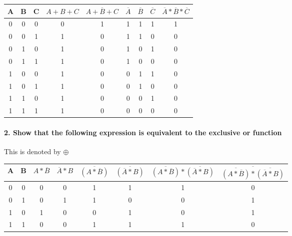 \begin{enumerate}
	\begin{table}[H]
		\centering
		\begin{tabular}{|c|c|c|c|c|c|c|c|c|}
			\hline
			A & B & C & $A+B+C$ & $\overline{A+B+C}$ & $\overline{A}$ & $\overline{B}$ & $\overline{C}$ & $\overline{A}*\overline{B}*\overline{C}$ \\\hline
			0 & 0 & 0 & 0     & 1                & 1            & 1            & 1   	  & 1                                      \\\hline
			0 & 0 & 1 & 1     & 0                & 1            & 1            & 0            & 0                                      \\\hline
			0 & 1 & 0 & 1     & 0                & 1            & 0            & 1            & 0                                      \\\hline
			0 & 1 & 1 & 1     & 0                & 1            & 0            & 0            & 0                                      \\\hline
			1 & 0 & 0 & 1     & 0                & 0            & 1            & 1            & 0                                      \\\hline
			1 & 0 & 1 & 1     & 0                & 0            & 1            & 0            & 0                                      \\\hline
			1 & 1 & 0 & 1     & 0                & 0            & 0            & 1            & 0                                      \\\hline
			1 & 1 & 1 & 1     & 0                & 0            & 0            & 0            & 0                                      \\\hline
		\end{tabular}
	\end{table}
\end{enumerate}

\paragraph{2. Show that the following expression is equivalent to the exclusive or function}

This is denoted by $\oplus$

\begin{table}[H]
	\centering
	\begin{tabular}{|c|c|c|c|c|c|c|c|}
		\hline
		A & B & $A * \overline{B}$ & $\overline{A} * B$ & $\overline{(A * \overline{B})}$ & $\overline{(\overline{A} * B)}$ & $\overline{(A * \overline{B})} * \overline{(\overline{A} * B)}$ & $\overline{\overline{(A * \overline{B})} * \overline{(\overline{A} * B)}}$\\\hline
		0 & 0 & 0 & 0 & 1 & 1 & 1 & 0\\\hline
		0 & 1 & 0 & 1 & 1 & 0 & 0 & 1\\\hline
		1 & 0 & 1 & 0 & 0 & 1 & 0 & 1\\\hline
		1 & 1 & 0 & 0 & 1 & 1 & 1 & 0\\\hline
	\end{tabular}
\end{table}

